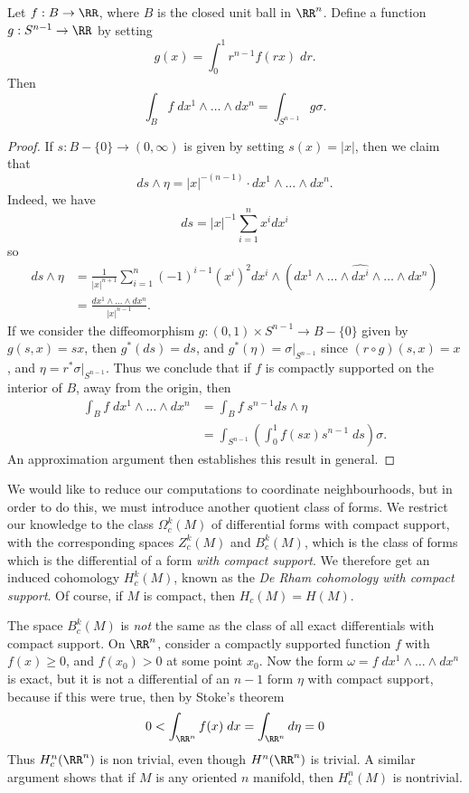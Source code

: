 \begin{theorem}
    Let $f: B \to \RR$, where $B$ is the closed unit ball in $\RR^n$. Define a function $g: S^{n-1} \to \RR$ by setting
    \[ g(x) = \int_0^1 r^{n-1} f(rx)\; dr. \]
    Then
    \[ \int_B f\; dx^1 \wedge \dots \wedge dx^n = \int_{S^{n-1}} g \sigma. \]
\end{theorem}
\begin{proof}
    If $s: B - \{ 0 \} \to (0,\infty)$ is given by setting $s(x) = |x|$, then we claim that
    \[ ds \wedge \eta = |x|^{-(n-1)} \cdot dx^1 \wedge \dots \wedge dx^n. \]
    Indeed, we have
    \[ ds = |x|^{-1} \sum_{i = 1}^n x^i dx^i \]
    so
    \begin{align*}
        ds \wedge \eta &= \frac{1}{|x|^{n+1}} \sum_{i = 1}^n (-1)^{i-1} (x^i)^2 dx^i \wedge (dx^1 \wedge \dots \wedge \widehat{dx^i} \wedge \dots \wedge dx^n)\\
        &= \frac{dx^1 \wedge \dots \wedge dx^n}{|x|^{n-1}}.
    \end{align*}
    If we consider the diffeomorphism $g: (0,1) \times S^{n-1} \to B - \{ 0 \}$ given by $g(s,x) = sx$, then $g^*(ds) = ds$, and $g^*(\eta) = \sigma|_{S^{n-1}}$ since $(r \circ g)(s,x) = x$, and $\eta = r^* \sigma|_{S^{n-1}}$. Thus we conclude that if $f$ is compactly supported on the interior of $B$, away from the origin, then
    \begin{align*}
        \int_B f\; dx^1 \wedge \dots \wedge dx^n &= \int_B f\; s^{n-1} ds \wedge \eta\\
        &= \int_{S^{n-1}} \left( \int_0^1 f(sx) s^{n-1}\; ds \right) \sigma.
    \end{align*}
    An approximation argument then establishes this result in general.
\end{proof}

We would like to reduce our computations to coordinate neighbourhoods, but in order to do this, we must introduce another quotient class of forms. We restrict our knowledge to the class $\Omega^k_c(M)$ of differential forms with compact support, with the corresponding spaces $Z^k_c(M)$ and $B^k_c(M)$, which is the class of forms which is the differential of a form {\it with compact support}. We therefore get an induced cohomology $H^k_c(M)$, known as the \emph{De Rham cohomology with compact support}. Of course, if $M$ is compact, then $H_c(M) = H(M)$.

\begin{example}
    The space $B^k_c(M)$ is {\it not} the same as the class of all exact differentials with compact support. On $\RR^n$, consider a compactly supported function $f$ with $f(x) \geq 0$, and $f(x_0) > 0$ at some point $x_0$. Now the form $\omega = f\; dx^1 \wedge \dots \wedge dx^n$ is exact, but it is not a differential of an $n-1$ form $\eta$ with compact support, because if this were true, then by Stoke's theorem
    \[ 0 < \int_{\RR^n} f(x)\; dx = \int_{\RR^n} d\eta = 0 \]
    Thus $H^n_c(\RR^n)$ is non trivial, even though $H^n(\RR^n)$ is trivial. A similar argument shows that if $M$ is any oriented $n$ manifold, then $H^n_c(M)$ is nontrivial.
\end{example}

